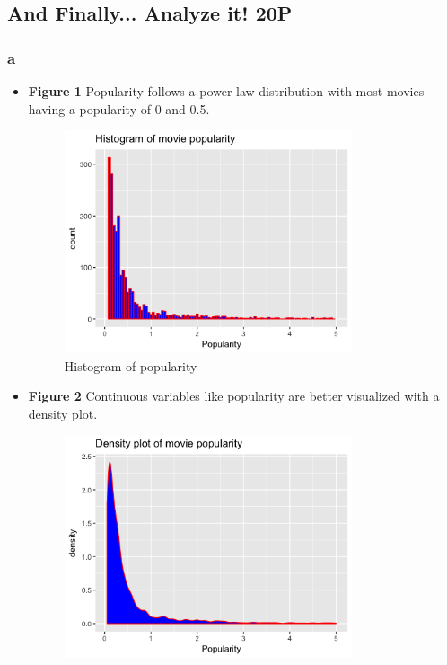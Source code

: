 \documentclass[a4paper]{article}
\begin{document}
	\subsection{And Finally... Analyze it! 20P}
	
	\subsubsection{a}
	
	\begin{itemize}
		\item \textbf{Figure 1} Popularity follows a power law distribution with most movies having a popularity of 0 and 0.5.
		\begin{figure}[h]
		\begin{center}
		\includegraphics[width=0.8\textwidth]{fig_1_histogram_popularity}
		\caption{Histogram of popularity}
		\label{fig:f1}
		\end{center}
		\end{figure}
		\item \textbf{Figure 2} Continuous variables like popularity are better visualized with a density plot.
		\begin{figure}[h]
		\begin{center}
		\includegraphics[width=0.8\textwidth]{fig_2_density_popularity}

\end{center}
\end{figure}
\end{itemize}
\end{document}
